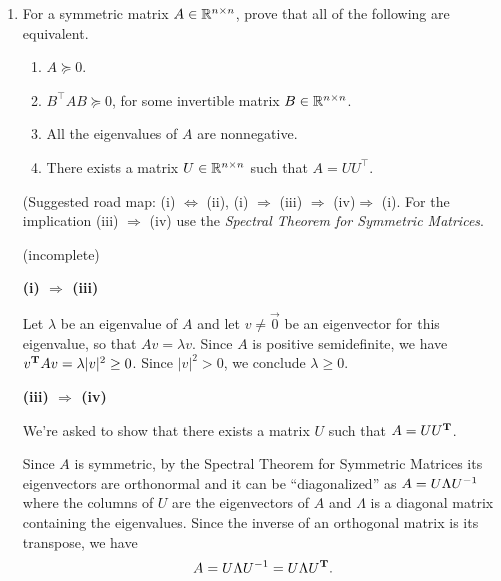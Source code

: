 \documentclass{article}
\begin{document}
\begin{enumerate}[label=(\alph*)]
    \item For a symmetric matrix $A \in \mathbb{R}^{n\times n}$, prove that all of the following are equivalent.
    \begin{enumerate}[label=(\roman*)]
        \item $A \succeq 0$.
        \item $B^{\top} AB \succeq 0$, for some invertible matrix $B \in \mathbb{R}^{n\times n}$.
        \item All the eigenvalues of $A$ are nonnegative.
        \item There exists a matrix $U \in \mathbb{R}^{n\times n}$ such that $A = U U^{\top}$.
    \end{enumerate}

    (Suggested road map: (i) $\Leftrightarrow$ (ii), (i) $\Rightarrow$ (iii) $\Rightarrow$ (iv)$ \Rightarrow$ (i). For the implication (iii) $\Rightarrow$ (iv) use the \emph{Spectral Theorem for Symmetric Matrices}.

    \begin{mdframed}
      (incomplete)

      \textbf{(i) $\Rightarrow$ (iii)}

      Let $\lambda$ be an eigenvalue of $A$ and let $v \neq \vec 0$ be an eigenvector for
      this eigenvalue, so that $Av = \lambda v$. Since $A$ is positive
      semidefinite, we have $v^{\mathbf{T}} Av = \lambda |v|^2 \geq 0$. Since
      $|v|^2 > 0$, we conclude $\lambda \geq 0$.


      \textbf{(iii) $\Rightarrow$ (iv)}

      We're asked to show that there exists a matrix $U$ such that $A = UU^{\mathbf{T}}$.

      Since $A$ is symmetric, by the Spectral Theorem for Symmetric Matrices
      its eigenvectors are orthonormal and it can be ``diagonalized'' as
      $A = U\Lambda U^{-1}$ where the columns of $U$ are the eigenvectors of $A$
      and $\Lambda$ is a diagonal matrix containing the eigenvalues. Since the
      inverse of an orthogonal matrix is its transpose, we have
      $$
      A = U\Lambda U^{-1} = U\Lambda U^{\mathbf{T}}.
      $$

    \end{mdframed}


\end{enumerate}
\end{document}
